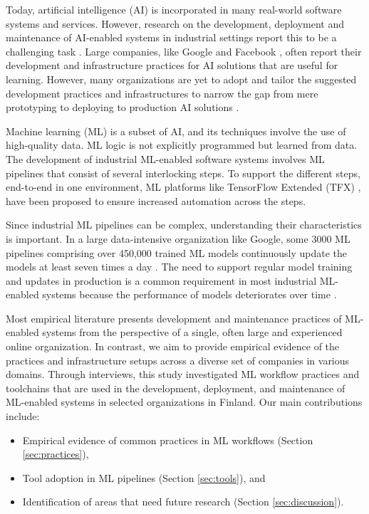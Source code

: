 Today, artificial intelligence (AI) is incorporated in many real-world software systems and services. However, research on the development, deployment and maintenance of AI-enabled systems in industrial settings report this to be a challenging task \cite{Sculley2015, Lwakatare2019}. Large companies, like Google \cite{Baylor2017} and Facebook \cite{Hazelwood2018Facebook}, often report their development and infrastructure practices for AI solutions that are useful for learning. However, many organizations are yet to adopt and tailor the suggested development practices and infrastructures to narrow the gap from mere prototyping to deploying to production AI solutions \cite{Serban2020Practices}. 

Machine learning (ML) is a subset of AI, and its techniques involve the use of high-quality data. ML logic is not explicitly programmed but  learned from data. The development of industrial ML-enabled software systems involves ML pipelines that consist of several interlocking steps. To support the different steps, end-to-end in one environment, ML platforms like TensorFlow Extended (TFX) \cite{Baylor2017}, have been proposed to ensure increased automation across the steps.

Since industrial ML pipelines can be complex, understanding their characteristics is important. In a large data-intensive organization like Google, some 3000 ML pipelines comprising over 450,000 trained ML models continuously update the models at least seven times a day \cite{Doris2021MLPipelines}. %
The need to support regular model training and updates in production is a common requirement in most industrial ML-enabled systems because
the performance of models deteriorates over time \cite{Sculley2015}.

Most empirical literature presents development and maintenance practices of ML-enabled systems from the perspective of a single, often large and experienced online organization. In contrast, we aim to provide empirical evidence of the practices and infrastructure setups across a diverse set of companies in various domains. Through interviews, this study investigated ML workflow practices and toolchains that are used in the development, deployment, and maintenance of ML-enabled systems in selected organizations in Finland. Our main contributions include:
\begin{itemize}
    \item Empirical evidence of common practices in ML workflows (Section \ref{sec:practices}),
    \item Tool adoption in ML pipelines (Section \ref{sec:tools}), and 
    \item Identification of areas that need future research (Section \ref{sec:discussion}).
\end{itemize}

